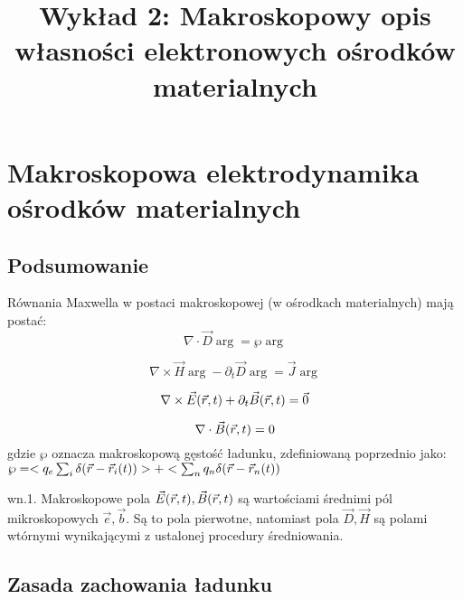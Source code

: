 
\title{Wykład 2: Makroskopowy opis własności elektronowych ośrodków materialnych}



\section{Makroskopowa elektrodynamika ośrodków materialnych}
\subsection{Podsumowanie}
Równania Maxwella w postaci makroskopowej (w ośrodkach materialnych) mają postać:
\begin{equation} \nabla \cdot \vec{D}\arg=\wp\arg \label{r1}
 \end{equation}
 
\begin{equation} \nabla \times \vec{H}\arg-\partial_t\vec{D}\arg=\vec{J}\arg \label{r2}
\end{equation}

\begin{equation} \nabla \times \vec{E}(\vec{r},t)+\partial_t \vec{B}(\vec{r},t)=\vec{0} \label{r3}\end{equation} 

\begin{equation} \nabla \cdot \vec{B}(\vec{r},t)=0 \end{equation}
gdzie $\wp$ oznacza makroskopową gęstość ładunku, zdefiniowaną poprzednio jako: $\wp=<q_e\sum_i\delta(\vec{r}-\vec{r}_i(t))>+<\sum_nq_n\delta(\vec{r}-\vec{r}_n(t))$

wn.1. Makroskopowe pola $\vec{E}(\vec{r},t),\vec{B}(\vec{r},t)$ są wartościami średnimi pól mikroskopowych $\vec{e},\vec{b}$. Są to pola pierwotne, natomiast pola $\vec{D},\vec{H}$ są polami wtórnymi wynikającymi z ustalonej procedury średniowania.

\subsection{Zasada zachowania ładunku}
